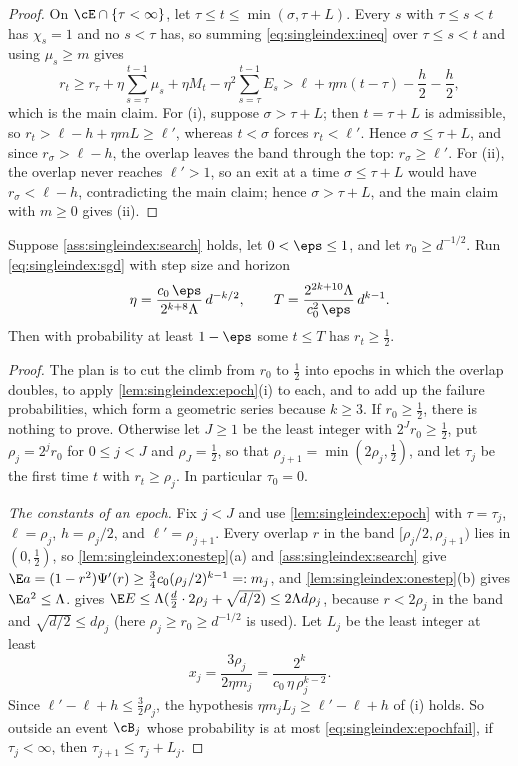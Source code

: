 \begin{refsection}
\begin{proof}
On $\cE\cap\{\tau<\infty\}$, let $\tau\le t\le\min(\sigma,\tau+L)$. Every $s$ with $\tau\le s<t$ has $\chi_s=1$ and no $s<\tau$ has, so summing \eqref{eq:singleindex:ineq} over $\tau\le s<t$ and using $\mu_s\ge m$ gives
\[
  r_t\ge r_\tau+\eta\sum_{s=\tau}^{t-1}\mu_s+\eta M_t-\eta^2\sum_{s=\tau}^{t-1}E_s>\ell+\eta m(t-\tau)-\frac h2-\frac h2 ,
\]
which is the main claim. For (i), suppose $\sigma>\tau+L$; then $t=\tau+L$ is admissible, so $r_t>\ell-h+\eta mL\ge\ell'$, whereas $t<\sigma$ forces $r_t<\ell'$. Hence $\sigma\le\tau+L$, and since $r_\sigma>\ell-h$, the overlap leaves the band through the top: $r_\sigma\ge\ell'$. For (ii), the overlap never reaches $\ell'>1$, so an exit at a time $\sigma\le\tau+L$ would have $r_\sigma<\ell-h$, contradicting the main claim; hence $\sigma>\tau+L$, and the main claim with $m\ge0$ gives (ii).
\end{proof}

\begin{theorem}\label{thm:singleindex:sgd}
Suppose \cref{ass:singleindex:search} holds, let $0<\eps\le1$, and let $r_0\ge d^{-1/2}$. Run \eqref{eq:singleindex:sgd} with step size and horizon
\[
  \eta=\frac{c_0\,\eps}{2^{k+8}\Lambda}\,d^{-k/2},\qquad T=\frac{2^{2k+10}\Lambda}{c_0^2\,\eps}\,d^{k-1}.
\]
Then with probability at least $1-\eps$ some $t\le T$ has $r_t\ge\frac12$.
\end{theorem}

\begin{proof}
The plan is to cut the climb from $r_0$ to $\frac12$ into epochs in which the overlap doubles, to apply \cref{lem:singleindex:epoch}(i) to each, and to add up the failure probabilities, which form a geometric series because $k\ge3$. If $r_0\ge\frac12$, there is nothing to prove. Otherwise let $J\ge1$ be the least integer with $2^Jr_0\ge\frac12$, put $\rho_j=2^jr_0$ for $0\le j<J$ and $\rho_J=\frac12$, so that $\rho_{j+1}=\min(2\rho_j,\frac12)$, and let $\tau_j$ be the first time $t$ with $r_t\ge\rho_j$. In particular $\tau_0=0$.

\emph{The constants of an epoch.} Fix $j<J$ and use \cref{lem:singleindex:epoch} with $\tau=\tau_j$, $\ell=\rho_j$, $h=\rho_j/2$, and $\ell'=\rho_{j+1}$. Every overlap $r$ in the band $[\rho_j/2,\rho_{j+1})$ lies in $(0,\frac12)$, so \cref{lem:singleindex:onestep}(a) and \cref{ass:singleindex:search} give $\E a=(1-r^2)\Psi'(r)\ge\frac34c_0(\rho_j/2)^{k-1}=:m_j$, and \cref{lem:singleindex:onestep}(b) gives $\E a^2\le\Lambda$.  gives $\E E\le\Lambda(\frac d2\cdot2\rho_j+\sqrt{d/2})\le2\Lambda d\rho_j$, because $r<2\rho_j$ in the band and $\sqrt{d/2}\le d\rho_j$ (here $\rho_j\ge r_0\ge d^{-1/2}$ is used). Let $L_j$ be the least integer at least
\[
  x_j=\frac{3\rho_j}{2\eta m_j}=\frac{2^k}{c_0\,\eta\,\rho_j^{k-2}} .
\]
Since $\ell'-\ell+h\le\frac32\rho_j$, the hypothesis $\eta m_jL_j\ge\ell'-\ell+h$ of (i) holds. So outside an event $\cB_j$ whose probability is at most \eqref{eq:singleindex:epochfail}, if $\tau_j<\infty$, then $\tau_{j+1}\le\tau_j+L_j$.


\end{proof}
\end{refsection}

